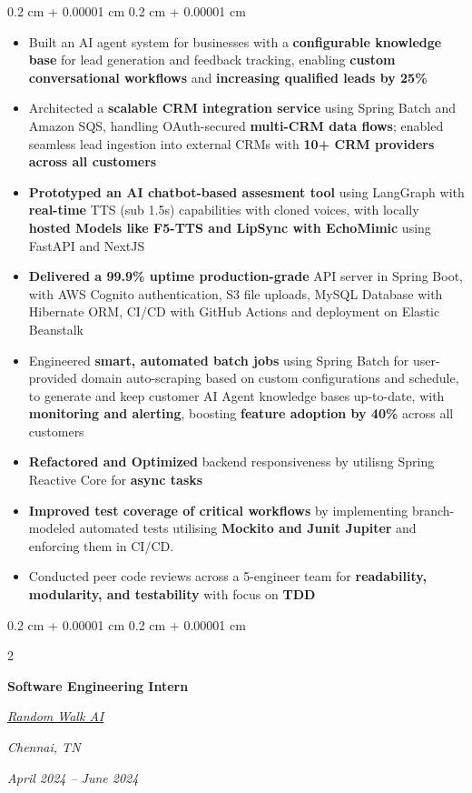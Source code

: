 \documentclass[10pt, letterpaper]{article}
\newenvironment{highlights}{
    \begin{itemize}[
        topsep=0.10 cm,
        parsep=0.10 cm,
        partopsep=0pt,
        itemsep=0pt,
        leftmargin=0.1 cm + 10pt
    ]
}{
    \end{itemize}
} %
\newenvironment{onecolentry}{
    \begin{adjustwidth}{
        0.2 cm + 0.00001 cm
    }{
        0.2 cm + 0.00001 cm
    }
}{
    \end{adjustwidth}
} %
\newenvironment{twocolentry}[2][]{
    \onecolentry
    \def\secondColumn{#2}
    \setcolumnwidth{\fill, 4.5 cm}
    \begin{paracol}{2}
}{
    \switchcolumn\raggedleft\secondColumn
    \end{paracol}
    \endonecolentry
} %
\let\hrefWithoutArrow\href
\renewcommand{\href}[2]{\hrefWithoutArrow{#1}{\ifthenelse{\equal{#2}{}}{ }{#2 }\raisebox{.15ex}{\footnotesize \faExternalLink*}}}
\begin{document}
\vspace{0.10 cm}
\begin{onecolentry}
    \begin{highlights}
    \item Built an AI agent system for businesses with a \textbf{configurable knowledge base} for lead generation and feedback tracking, enabling \textbf{custom conversational workflows} and \textbf{increasing qualified leads by 25\%}
    \item Architected a \textbf{scalable CRM integration service} using Spring Batch and Amazon SQS, handling OAuth-secured \textbf{multi-CRM data flows}; enabled seamless lead ingestion into external CRMs with \textbf{10+ CRM providers across all customers}
    \item \textbf{Prototyped an AI chatbot-based assesment tool} using LangGraph with \textbf{real-time} TTS (sub 1.5s) capabilities with cloned voices, with locally \textbf{hosted Models like F5-TTS and LipSync with EchoMimic} using FastAPI and NextJS
    \item \textbf{Delivered a 99.9\% uptime production-grade} API server in Spring Boot, with AWS Cognito authentication, S3 file uploads, MySQL Database with Hibernate ORM, CI/CD with GitHub Actions and deployment on Elastic Beanstalk    
    \item Engineered \textbf{smart, automated batch jobs} using Spring Batch for user-provided domain auto-scraping based on custom configurations and schedule, to generate and keep customer AI Agent knowledge bases up-to-date, with \textbf{monitoring and alerting}, boosting \textbf{feature adoption by 40\%} across all customers
    \item \textbf{Refactored and Optimized} backend responsiveness by utilisng Spring Reactive Core for \textbf{async tasks}
    \item \textbf{Improved test coverage of critical workflows} by implementing branch-modeled automated tests utilising \textbf{Mockito and Junit Jupiter} and enforcing them in CI/CD.
    \item Conducted peer code reviews across a 5-engineer team for \textbf{readability, modularity, and testability} with focus on \textbf{TDD}
    \end{highlights}
\end{onecolentry}

\vspace{0.2 cm}

\begin{twocolentry}{
        \textit{Chennai, TN}

        \textit{April 2024 – June 2024}}
    \textbf{Software Engineering Intern}

    \textit{{\hrefWithoutArrow{https://randomwalk.ai/}{\color{black}\hspace*{0.13cm}Random Walk AI}}}
\end{twocolentry}
\end{document}
